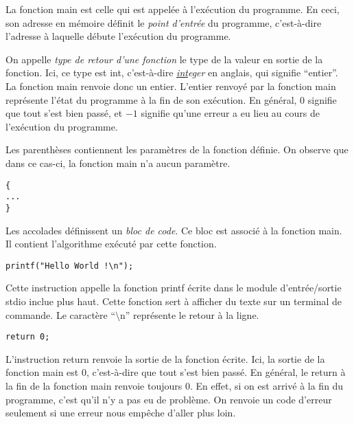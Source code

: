 \documentclass[../../main.tex]{subfiles}
\begin{document}
La fonction \textsf{main} est celle qui est appelée à l'exécution du programme. En ceci, son adresse en mémoire définit le \textit{point d'entrée} du programme, c'est-à-dire l'adresse à laquelle débute l'exécution du programme.

On appelle \textit{type de retour d'une fonction} le type de la valeur en sortie de la fonction. Ici, ce type est \textsf{int}, c'est-à-dire \textit{\underline{int}eger} en anglais, qui signifie ``entier''. La fonction \textsf{main} renvoie donc un entier. L'entier renvoyé par la fonction \textsf{main} représente l'état du programme à la fin de son exécution. En général, 0 signifie que tout s'est bien passé, et $-1$ signifie qu'une erreur a eu lieu au cours de l'exécution du programme.

Les parenthèses contiennent les paramètres de la fonction définie. On observe que dans ce cas-ci, la fonction \textsf{main} n'a aucun paramètre.
\begin{verbatim}
{
...
}
\end{verbatim}
Les accolades définissent un \textit{bloc de code}. Ce bloc est associé à la fonction \textsf{main}. Il contient l'algorithme exécuté par cette fonction.
\begin{verbatim}
printf("Hello World !\n");
\end{verbatim}
Cette instruction appelle la fonction \textsf{printf} écrite dans le module d'entrée/sortie \textsf{stdio} inclue plus haut. Cette fonction sert à afficher du texte sur un terminal de commande. Le caractère ``$\setminus$n'' représente le retour à la ligne.
\begin{verbatim}
return 0;
\end{verbatim}
L'instruction \textsf{return} renvoie la sortie de la fonction écrite. Ici, la sortie de la fonction \textsf{main} est 0, c'est-à-dire que tout s'est bien passé. En général, le \textsf{return} à la fin de la fonction \textsf{main} renvoie toujours 0. En effet, si on est arrivé à la fin du programme, c'est qu'il n'y a pas eu de problème. On renvoie un code d'erreur seulement si une erreur nous empêche d'aller plus loin.
\end{document}
